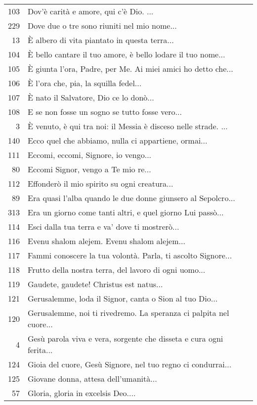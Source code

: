 {\begin{flushleft}
\begin{longtable}{r m{11cm}}
    103 & Dov'è carità e amore, qui c'è Dio. ...\\
    229 & Dove due o tre sono riuniti nel mio nome...\\
    13 & È albero di vita piantato in questa terra...\\
    104 & È bello cantare il tuo amore, è bello lodare il tuo nome...\\
    105 & È giunta l'ora, Padre, per Me. Ai miei amici ho detto che...\\
    106 & È l'ora che, pia, la squilla fedel...\\
    107 & È nato il Salvatore, Dio ce lo donò...\\
    108 & E se non fosse un sogno se tutto fosse vero...\\
    3 & È venuto, è qui tra noi: il Messia è disceso nelle strade. ...\\
    140 & Ecco quel che abbiamo, nulla ci appartiene, ormai...\\
    111 & Eccomi, eccomi, Signore, io vengo...\\
    80 & Eccomi Signor, vengo a Te mio re...\\
    112 & Effonderò il mio spirito su ogni creatura...\\
    89 & Era quasi l'alba quando le due donne giunsero al Sepolcro...\\
    313 & Era un giorno come tanti altri, e quel giorno Lui passò...\\
    114 & Esci dalla tua terra e va' dove ti mostrerò...\\
    116 & Evenu shalom alejem. Evenu shalom alejem...\\
    117 & Fammi conoscere la tua volontà. Parla, ti ascolto Signore...\\
    118 & Frutto della nostra terra, del lavoro di ogni uomo...\\
    119 & Gaudete, gaudete! Christus est natus...\\
    121 & Gerusalemme, loda il Signor, canta o Sion al tuo Dio...\\
    120 & Gerusalemme, noi ti rivedremo. La speranza ci palpita nel cuore...\\
    4 & Gesù parola viva e vera, sorgente che disseta e cura ogni ferita...\\
    124 & Gioia del cuore, Gesù Signore, nel tuo regno ci condurrai...\\
    125 & Giovane donna, attesa dell'umanità...\\
    57 & Gloria, gloria in excelsis Deo....\\

\end{longtable}
\end{flushleft}}
